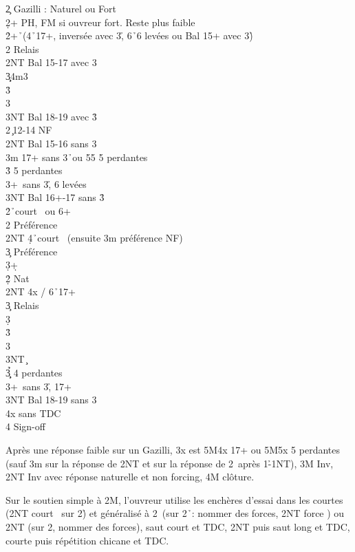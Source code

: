 \documentclass[a4paper]{article}
\begin{document}
\begin{bidtable}
2\c \> Gazilli : Naturel ou Fort\+\\
2\d {}+ PH, FM si ouvreur fort. Reste plus faible\+\\
2\h {}+\h\ (4\h\ 17+, inversée avec 3\h , 6\h\ 6 levées ou Bal 15+ avec 3\h )\+\\
2\s \> Relais\+\\
2NT \> Bal 15-17 avec 3\h \\
3\c\d {}\s 4m3\h \\
3\h {}\h \\
3\s {}\h \\
3NT \> Bal 18-19 avec 3\h \-\-\\
2\s {}\c\ 12-14 NF\\
2NT \> Bal 15-16 sans 3\h \\
3m  17+ sans 3\h\ ou 55 5 perdantes\\
3\h {} 5 perdantes\\
3\s {}+\s\ sans 3\h , 6 levées\\
3NT \> Bal 16+-17 sans 3\h \-\\
2\h {}\h\ court \s\ ou 6+\h \\
2\s \> Préférence\\
2NT \d 4\h\ court \s\ (ensuite 3m préférence NF)\\
3\c \> Préférence\\
3\d {}+\d \-\\
2\d\h\s \> Nat\\
2NT \s 4x / 6\h\ 17+\+\\
3\c \> Relais\+\\
3\d {}\d \\
3\h {}\h \\
3\s {}\h \\
3NT \c \-\-\\
3\c\d\h {} 4 perdantes\\
3\s {}+\s\ sans 3\h , 17+\\
3NT \> Bal 18-19 sans 3\h \\
4x  sans TDC\\
4\s \> Sign-off
\end{bidtable}

Après une réponse faible sur un Gazilli, 3x est 5M4x 17+ ou 5M5x 5 perdantes (sauf 3m sur la réponse de 2NT et sur la réponse de 2\s\ après 1\h -1NT), 3M Inv, 2NT Inv avec réponse naturelle et non forcing, 4M clôture.

Sur le soutien simple à 2M, l'ouvreur utilise les enchères d'essai dans les courtes (2NT court \s\ sur 2\h ) et généralisé à 2\s\ (sur 2\h\ : nommer des forces, 2NT force \s ) ou 2NT (sur 2\s , nommer des forces), saut court et TDC, 2NT puis saut long et TDC, courte puis répétition chicane et TDC.
\end{document}
